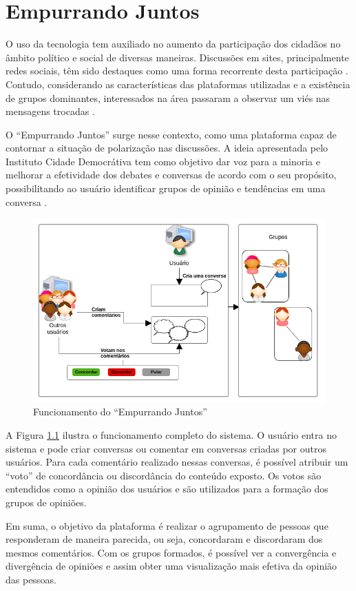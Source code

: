 \chapter{Empurrando Juntos} \label{cap:empurrandojuntos}

O uso da tecnologia tem auxiliado no aumento da participação dos 
cidadãos no âmbito político e social de diversas maneiras. Discussões em sites, principalmente redes sociais, têm sido
destaques como uma forma recorrente desta participação \cite{marques2008participaccao}.
Contudo, considerando as características das plataformas utilizadas e a existência de grupos dominantes, interessados
na área passaram a observar um viés nas mensagens trocadas \cite{empurrandojuntos, marques2008participaccao}. 

O ``Empurrando Juntos'' surge nesse contexto, como uma plataforma capaz de contornar a situação de polarização nas discussões.
A ideia apresentada pelo Instituto Cidade Democrátiva tem como objetivo dar voz para a minoria e 
melhorar a efetividade dos debates e conversas de acordo com o seu propósito, possibilitando ao usuário
identificar grupos de opinião e tendências em uma conversa \cite{empurrandojuntos}. 

\begin{figure}[h!]
\centering
\includegraphics[scale=0.6]{figuras/resumo_ej.png}
\caption{Funcionamento do ``Empurrando Juntos''}
\label{fig:resumo_ej}
\end{figure}

A Figura \ref{fig:resumo_ej} ilustra o funcionamento completo do sistema. O usuário entra no sistema e pode criar conversas ou
comentar em conversas criadas por outros usuários. Para cada comentário realizado nessas conversas, é possível atribuir um 
``voto'' de concordância ou discordância do conteúdo exposto. Os votos são entendidos como a opinião dos usuários e são
utilizados para a formação dos grupos de opiniões. 

Em suma, o objetivo da plataforma é realizar o agrupamento de 
pessoas que responderam de maneira parecida, ou seja, concordaram e discordaram dos mesmos comentários.
Com os grupos formados, é possível ver a convergência e divergência de opiniões e assim
obter uma visualização mais efetiva da opinião das pessoas. 
